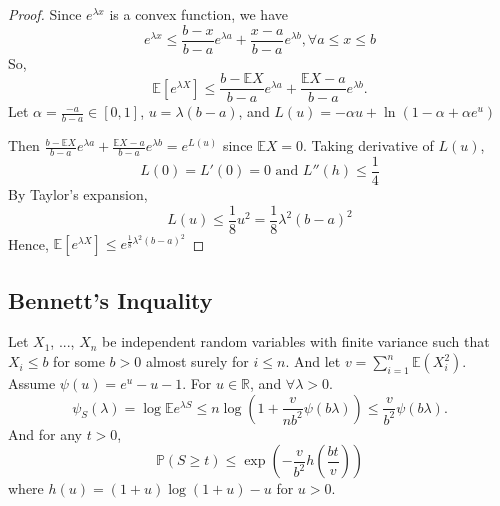 \documentclass[11pt]{article}
\def\BP{{\bf P}}
\def\BR{{\mathbb R}}
\def\BE{{\mathbb E}}
\def\BP{{\mathbb P}}
\begin{document}
\begin{proof}
 Since $e^{\lambda x}$ is a convex function, we have 
 \[ e^{\lambda x} \leq \frac{b - x}{b - a} e^{\lambda a} + \frac{x - a}{b - a} e^{\lambda b}, \forall a \leq x \leq b \]
 So, 
 \[ \BE[e^{\lambda X}] \leq \frac{b - \BE X}{b - a} e^{\lambda a} + \frac{\BE X - a}{b - a} e^{\lambda b}. \]
 Let $\alpha = \frac{-a}{b - a} \in [0, 1]$, $u = \lambda(b -a)$, and $L(u) = -\alpha u + \ln (1 - \alpha + \alpha e^u)$
 
 Then $\frac{b - \BE X}{b - a} e^{\lambda a} + \frac{\BE X - a}{b - a} e^{\lambda b} = e^{L(u)}$ since $\BE X = 0$. 
 Taking derivative of $L(u)$,
 \[ L(0) = L'(0) = 0 \text{ and } L''(h) \leq \frac{1}{4} \]
 By Taylor's expansion, 
 \[ L(u) \leq \frac{1}{8}u^2 = \frac{1}{8}\lambda^2(b-a)^2 \]
 Hence, $\BE[e^{\lambda X}] \leq e^{\frac{1}{8} \lambda^2 (b-a)^2}$
\end{proof}


\subsection{Bennett's Inquality}

Let $X_1$, ..., $X_n$ be independent random variables with finite variance such that $X_i \leq b$ for some $b > 0$ almost surely for $i \leq n$. And let $v = \sum_{i=1}^n \BE(X_i^2)$. Assume $\psi(u) = e^u - u - 1$. For $u \in \BR$, and $\forall \lambda > 0$.
\[
\psi_S(\lambda) = \log \BE e^{\lambda S} \leq n \log (1 + \frac{v}{nb^2} \psi(b\lambda)) \leq \frac{v}{b^2} \psi(b\lambda).
\]
And for any $t > 0$,
\[
\BP (S \geq t) \leq \exp(-\frac{v}{b^2} h(\frac{bt}{v}))
\]
where $h(u) = (1 + u)\log(1+u) - u$ for $u > 0$.
\end{document}

